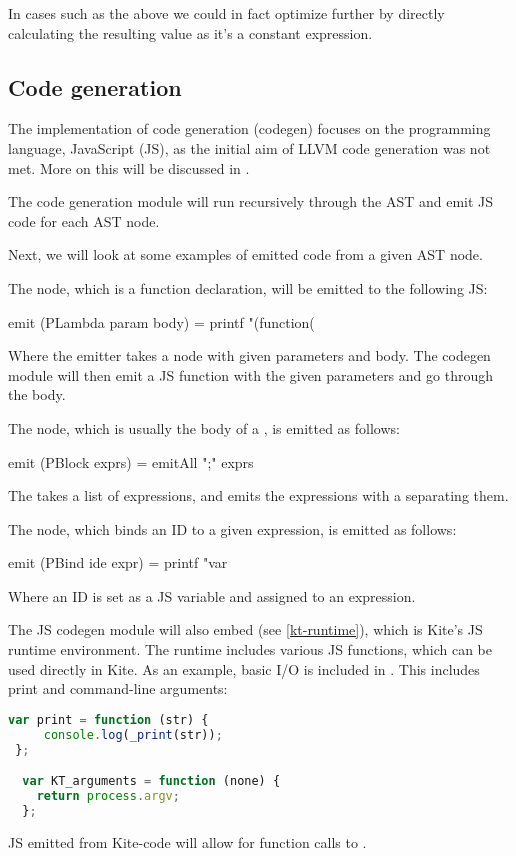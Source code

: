 In cases such as the above we could in fact optimize further by
directly  calculating the resulting value as it's a constant
expression.


\subsection{Code generation}
The implementation of code generation (codegen) focuses on the programming language, JavaScript (JS), as the initial aim of LLVM code generation was not met. More on this will be discussed in .

The code generation module will run recursively through the AST and emit JS code for each AST node.

Next, we will look at some examples of emitted code from a given AST node.

The  node, which is a function declaration, will be emitted to the following JS:
\begin{haskell}
  emit (PLambda param body) = printf "(function(%
\end{haskell}

Where the emitter takes a  node with given parameters and body. The codegen module will then emit a JS function with the given parameters and go through the body.

The  node, which is usually the body of a , is emitted as follows:
\begin{haskell}
  emit (PBlock exprs) =
  emitAll ";" exprs
\end{haskell}

The  takes a list of expressions, and emits the expressions with a \code{;} separating them.

The  node, which binds an ID to a given expression, is emitted as follows:
\begin{haskell}
  emit (PBind ide expr) =
  printf "var %
\end{haskell}
Where an ID is set as a JS variable  and assigned to an expression.

The JS codegen module will also embed  (see \ref{kt-runtime}), which is Kite's JS runtime environment. The runtime includes various JS functions, which can be used directly in Kite. As an example, basic I/O is included in . This includes print and command-line arguments:
\begin{lstlisting}[language=Javascript]
  var print = function (str) {
     console.log(_print(str));
 };

  var KT_arguments = function (none) {
    return process.argv;
  };
\end{lstlisting}

JS emitted from Kite-code will allow for function calls to .
